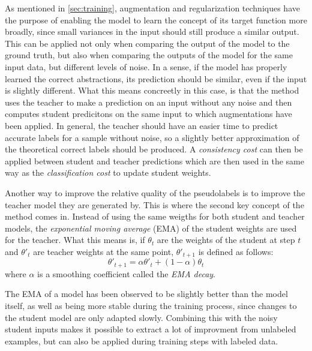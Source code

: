 As mentioned in \ref{sec:training}, augmentation and regularization techniques have the purpose of enabling the model to learn the concept of its target function more broadly, since small variances in the input should still produce a similar output. 
This can be applied not only when comparing the output of the model to the ground truth, but also when comparing the outputs of the model for the same input data, but different levels of noise. 
In a sense, if the model has properly learned the correct abstractions, its prediction should be similar, even if the input is slightly different.
What this means concreetly in this case, is that the method uses the teacher to make a prediction on an input without any noise and then computes student predicitons on the same input to which  augmentations have been applied.
In general, the teacher should have an easier time to predict accurate labels for a sample without noise, so a slightly better approximation of the theoretical correct labels should be produced. 
A \emph{consistency cost} can then be applied between student and teacher predictions which are then used in the same way as the \emph{classification cost} to update student weights.

Another way to improve the relative quality of the pseudolabels is to improve the teacher model they are generated by.
This is where the second key concept of the method comes in.
Instead of using the same weigths for both student and teacher models, the \emph{exponential moving average} (EMA) of the student weights are used for the teacher.
What this means is, if $\theta_t$ are the weights of the student at step $t$ and $\theta'_t$ are teacher weights at the same point, $\theta'_{t+1}$ is defined as follows:
$$
    \theta'_{t + 1} = \alpha\theta'_t + (1 - \alpha) \theta_t
$$
where $\alpha$ is a smoothing coefficient called the \emph{EMA decay}.

The EMA of a model has been observed to be slightly better than the model itself, as well as being more stable during the training process, since changes to the student model are only adapted slowly. Combining this with the noisy student inputs makes it possible to extract a lot of improvment from unlabeled examples, but can also be applied during training steps with labeled data. 

